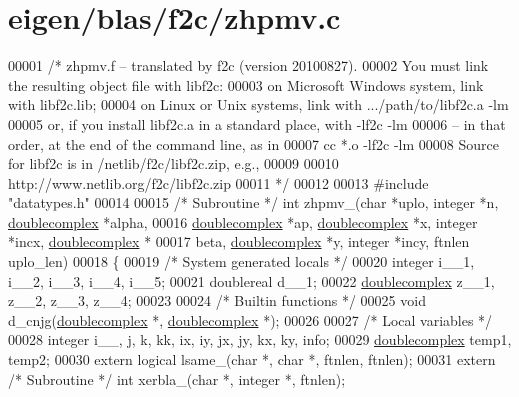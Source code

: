 \hypertarget{eigen_2blas_2f2c_2zhpmv_8c_source}{}\section{eigen/blas/f2c/zhpmv.c}
\label{eigen_2blas_2f2c_2zhpmv_8c_source}

\begin{DoxyCode}
00001 \textcolor{comment}{/* zhpmv.f -- translated by f2c (version 20100827).}
00002 \textcolor{comment}{   You must link the resulting object file with libf2c:}
00003 \textcolor{comment}{    on Microsoft Windows system, link with libf2c.lib;}
00004 \textcolor{comment}{    on Linux or Unix systems, link with .../path/to/libf2c.a -lm}
00005 \textcolor{comment}{    or, if you install libf2c.a in a standard place, with -lf2c -lm}
00006 \textcolor{comment}{    -- in that order, at the end of the command line, as in}
00007 \textcolor{comment}{        cc *.o -lf2c -lm}
00008 \textcolor{comment}{    Source for libf2c is in /netlib/f2c/libf2c.zip, e.g.,}
00009 \textcolor{comment}{}
00010 \textcolor{comment}{        http://www.netlib.org/f2c/libf2c.zip}
00011 \textcolor{comment}{*/}
00012 
00013 \textcolor{preprocessor}{#include "datatypes.h"}
00014 
00015 \textcolor{comment}{/* Subroutine */} \textcolor{keywordtype}{int} zhpmv\_(\textcolor{keywordtype}{char} *uplo, integer *n, \hyperlink{structdoublecomplex}{doublecomplex} *alpha, 
00016     \hyperlink{structdoublecomplex}{doublecomplex} *ap, \hyperlink{structdoublecomplex}{doublecomplex} *x, integer *incx, 
      \hyperlink{structdoublecomplex}{doublecomplex} *
00017     beta, \hyperlink{structdoublecomplex}{doublecomplex} *y, integer *incy, ftnlen uplo\_len)
00018 \{
00019     \textcolor{comment}{/* System generated locals */}
00020     integer i\_\_1, i\_\_2, i\_\_3, i\_\_4, i\_\_5;
00021     doublereal d\_\_1;
00022     \hyperlink{structdoublecomplex}{doublecomplex} z\_\_1, z\_\_2, z\_\_3, z\_\_4;
00023 
00024     \textcolor{comment}{/* Builtin functions */}
00025     \textcolor{keywordtype}{void} d\_cnjg(\hyperlink{structdoublecomplex}{doublecomplex} *, \hyperlink{structdoublecomplex}{doublecomplex} *);
00026 
00027     \textcolor{comment}{/* Local variables */}
00028     integer i\_\_, j, k, kk, ix, iy, jx, jy, kx, ky, info;
00029     \hyperlink{structdoublecomplex}{doublecomplex} temp1, temp2;
00030     \textcolor{keyword}{extern} logical lsame\_(\textcolor{keywordtype}{char} *, \textcolor{keywordtype}{char} *, ftnlen, ftnlen);
00031     \textcolor{keyword}{extern} \textcolor{comment}{/* Subroutine */} \textcolor{keywordtype}{int} xerbla\_(\textcolor{keywordtype}{char} *, integer *, ftnlen);

\end{DoxyCode}
